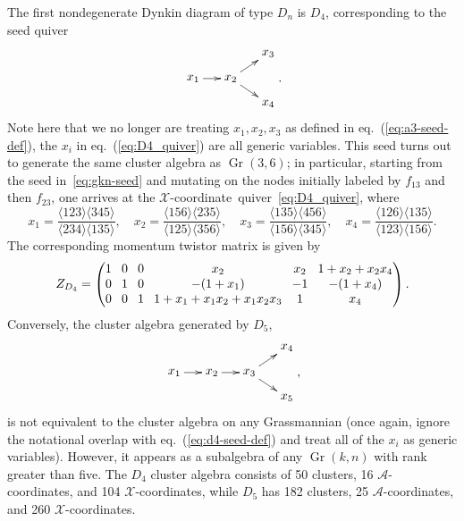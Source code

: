 \documentclass[11pt]{article}
\DeclareMathOperator{\Gr}{Gr}
\def\ket#1{\langle #1 \rangle}
\def\xcoord{$\mathcal{X}$-coordinate}
\def\xcoords{$\mathcal{X}$-coordinates}
\def\acoords{$\mathcal{A}$-coordinates}
\begin{document}
The first nondegenerate Dynkin diagram of type $D_n$ is $D_4$, corresponding to the seed quiver
\begin{equation} \label{eq:D4_quiver}
    \begin{gathered}
    \begin{xy} 0;<1pt,0pt>:<0pt,-1pt>::
      (0,20) *+{x_1} ="1",
      (30,20) *+{x_2} ="2",
      (60,0) *+{x_3} ="3",
      (60,40) *+{x_4} ="4",
      "1", {\ar"2"},
      "2", {\ar"3"},
      "2", {\ar"4"},
    \end{xy}
    \end{gathered} .
\end{equation}
Note here that we no longer are treating $x_1, x_2, x_3$ as defined in eq.~(\ref{eq:a3-seed-def}), the $x_i$ in eq.~(\ref{eq:D4_quiver}) are all generic variables. This seed turns out to generate the same cluster algebra as $\Gr(3,6)$; in particular, starting from the seed in~\eqref{eq:gkn-seed} and mutating on the nodes initially labeled by $f_{13}$ and then $f_{23}$, one arrives at the \xcoord\ quiver~\eqref{eq:D4_quiver}, where
\begin{equation}\label{eq:d4-seed-def}
x_1 = \frac{\ket{123}\ket{345}}{\ket{234}\ket{135}}, \quad x_2 = \frac{\ket{156}\ket{235}}{\ket{125}\ket{356}}, \quad x_3 = \frac{\ket{135}\ket{456}}{\ket{156}\ket{345}}, \quad x_4 = \frac{\ket{126}\ket{135}}{\ket{123}\ket{156}}.
\end{equation}
The corresponding momentum twistor matrix is given by
\begin{equation}
Z_{D_4} = 
\begingroup
\setlength\arraycolsep{4pt}
\begin{pmatrix} 
 1 & 0 & 0 & x_2 & x_2 & 1+x_2+x_2 x_4 \\
 0 & 1 & 0 & -(1+x_1) & -1 & - (1+x_4) \\
 0 & 0 & 1 & 1 + x_1 + x_1 x_2 + x_1 x_2 x_3 & 1 & x_4
 \end{pmatrix}
\endgroup .
\end{equation}
Conversely, the cluster algebra generated by $D_5$,
\begin{equation}\label{def:D5}
    \begin{gathered}
    \begin{xy} 0;<1pt,0pt>:<0pt,-1pt>::
      (0,20) *+{x_1} ="1",
      (30,20) *+{x_2} ="2",
      (60,20) *+{x_3} ="3",
      (90,0) *+{x_4} ="4",
      (90,40) *+{x_5} ="5",
      "1", {\ar"2"},
      "2", {\ar"3"},
      "3", {\ar"4"},
      "3", {\ar"5"},
    \end{xy}
    \end{gathered} ,
\end{equation}
is not equivalent to the cluster algebra on any Grassmannian (once again, ignore the notational overlap with eq.~(\ref{eq:d4-seed-def}) and treat all of the $x_i$ as generic variables). However, it appears as a subalgebra of any $\Gr(k,n)$ with rank greater than five. The $D_4$ cluster algebra consists of 50 clusters, 16 \acoords, and 104 \xcoords, while $D_5$ has 182 clusters, 25 \acoords, and 260 \xcoords. 
\end{document}
